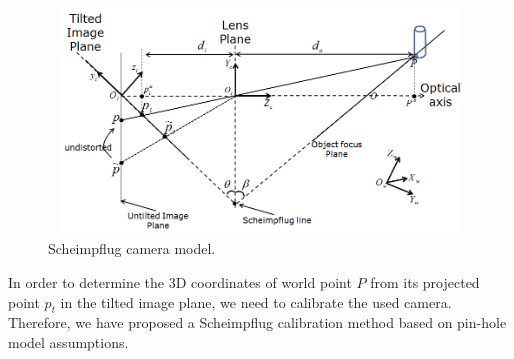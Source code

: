 \documentclass[12pt]{article}
\begin{document}
\begin{figure}[htb]
	\centering
	\includegraphics[height=6cm, width=12cm]{figures/scheimimg1.png}
	\caption {Scheimpflug camera model.}
	\label{fig:scheimpflug3}
\end{figure}









In order to determine the 3D coordinates of world point $P$ from its projected point $p_t$ in the tilted image plane, we need to calibrate the used camera. Therefore, we have proposed a Scheimpflug calibration method based on pin-hole model assumptions. 
\end{document}
